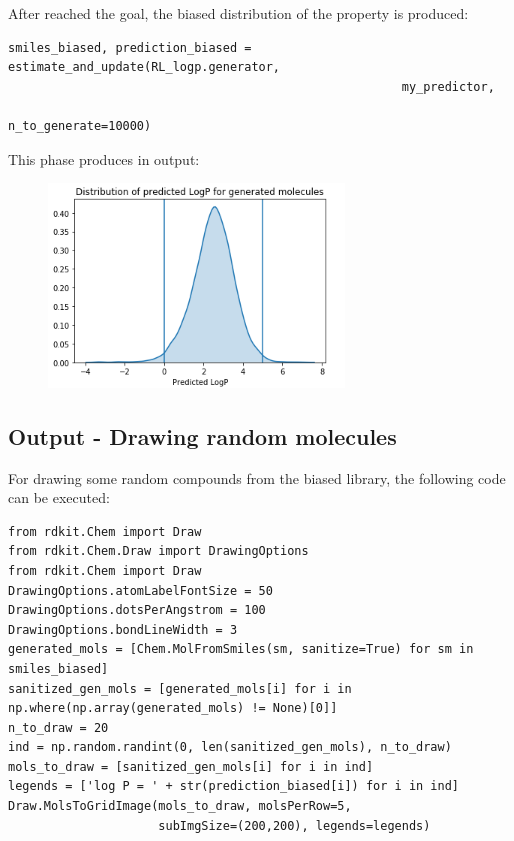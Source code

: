 \documentclass[a4paper]{article}
\begin{document}
After reached the goal, the biased distribution of the property is produced:

\begin{lstlisting}
smiles_biased, prediction_biased = estimate_and_update(RL_logp.generator, 
                                                       my_predictor,
                                                       n_to_generate=10000)
\end{lstlisting}

This phase produces in output: 

\begin{figure}[htbp]
		\centering
			\includegraphics[width=0.70\textwidth]{biased.png}
		\label{fig:biased}
	\end{figure}

\subsection{Output - Drawing random molecules}\label{sec:Output - Drawing random molecules}

For drawing some random compounds from the biased library, the following code can be executed:

\begin{lstlisting}
from rdkit.Chem import Draw
from rdkit.Chem.Draw import DrawingOptions
from rdkit.Chem import Draw
DrawingOptions.atomLabelFontSize = 50
DrawingOptions.dotsPerAngstrom = 100
DrawingOptions.bondLineWidth = 3
generated_mols = [Chem.MolFromSmiles(sm, sanitize=True) for sm in smiles_biased]
sanitized_gen_mols = [generated_mols[i] for i in np.where(np.array(generated_mols) != None)[0]]
n_to_draw = 20
ind = np.random.randint(0, len(sanitized_gen_mols), n_to_draw)
mols_to_draw = [sanitized_gen_mols[i] for i in ind]
legends = ['log P = ' + str(prediction_biased[i]) for i in ind]
Draw.MolsToGridImage(mols_to_draw, molsPerRow=5, 
                     subImgSize=(200,200), legends=legends)
\end{lstlisting}
\end{document}
